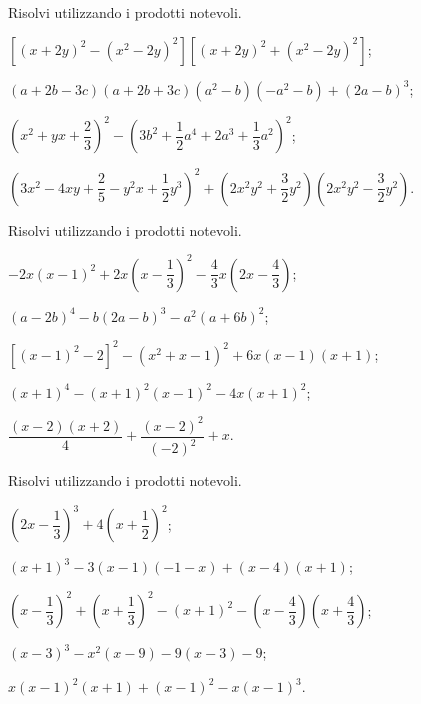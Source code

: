 \begin{esercizio}
Risolvi utilizzando i prodotti notevoli.
 \begin{enumeratea}
 \item $\left[\left(x+2y\right)^{2}-\left(x^{2}-2y\right)^{2}\right]\left[\left(x+2y\right)^{2}+\left(x^{2}-2y\right)^{2}\right]$;
 \item $(a+2b-3c)(a+2b+3c)\left(a^{2}-b\right)\left(-a^{2}-b\right)+(2a-b)^{3}$;
 \item $\left(x^{2}+yx+\dfrac{2}{3}\right)^{2}-\left(3b^{2}+\dfrac{1}{2}a^{4}+2a^{3}+\dfrac{1}{3}a^{2}\right)^{2}$;
 \item $\left(3x^{2}-4{xy}+\dfrac{2}{5}-y^{2}x+\dfrac{1}{2}y^{3}\right)^{2}+\left(2x^{2}y^{2}+\dfrac{3}{2}y^{2}\right)\left(2x^{2}y^{2}-\dfrac{3}{2}y^{2}\right)$.
 \end{enumeratea}
\end{esercizio}

\begin{esercizio}[\Ast]
Risolvi utilizzando i prodotti notevoli.
 \begin{enumeratea}
 \item $-2x(x-1)^{2}+2x\left(x-\dfrac{1}{3}\right)^{2}-\dfrac{4}{3}x\left(2x-\dfrac{4}{3}\right)$;
 \item $(a-2b)^{4}-b(2a-b)^{3}-a^{2}(a+6b)^{2}$;
 \item $[(x-1)^2-2]^2-\left(x^2+x-1\right)^2+6x(x-1)(x+1)$;
 \item $(x+1)^{4}-(x+1)^{2}(x-1)^{2}-4x(x+1)^{2}$;
 \item $\dfrac{(x-2)(x+2)}{4}+\dfrac{(x-2)^{2}}{(-2)^{2}}+x$.
 \end{enumeratea}
\end{esercizio}

\begin{esercizio}[\Ast]
Risolvi utilizzando i prodotti notevoli.
 \begin{enumeratea}
 \item $\left(2x-\dfrac{1}{3}\right)^{3}+4\left(x+\dfrac{1}{2}\right)^{2}$;
 \item $(x+1)^{3}-3(x-1)(-1-x)+(x-4)(x+1)$;
 \item $\left(x-\dfrac{1}{3}\right)^{2}+\left(x+\dfrac{1}{3}\right)^{2}-(x+1)^{2}-\left(x-\dfrac{4}{3}\right)\left(x+\dfrac{4}{3}\right)$;
 \item $(x-3)^{3}-x^{2}(x-9)-9(x-3)-9$;
 \item $x(x-1)^{2}(x+1)+(x-1)^{2}-x(x-1)^{3}$.
 \end{enumeratea}
\end{esercizio}

